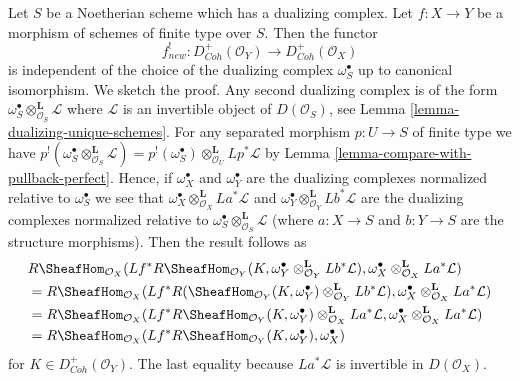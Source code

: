 \begin{remark}
\label{remark-independent-omega-S}
Let $S$ be a Noetherian scheme which has a dualizing complex.
Let $f : X \to Y$ be a morphism of schemes of finite type
over $S$. Then the functor
$$
f_{new}^! : D^+_{Coh}(\mathcal{O}_Y) \to D^+_{Coh}(\mathcal{O}_X)
$$
is independent of the choice of the dualizing complex $\omega_S^\bullet$
up to canonical isomorphism. We sketch the proof. Any second dualizing complex
is of the form $\omega_S^\bullet \otimes_{\mathcal{O}_S}^\mathbf{L} \mathcal{L}$
where $\mathcal{L}$ is an invertible object of $D(\mathcal{O}_S)$, see
Lemma \ref{lemma-dualizing-unique-schemes}.
For any separated morphism $p : U \to S$ of finite type we have
$p^!(\omega_S^\bullet \otimes^\mathbf{L}_{\mathcal{O}_S} \mathcal{L}) =
p^!(\omega_S^\bullet) \otimes^\mathbf{L}_{\mathcal{O}_U} Lp^*\mathcal{L}$
by Lemma \ref{lemma-compare-with-pullback-perfect}.
Hence, if $\omega_X^\bullet$ and $\omega_Y^\bullet$ are the
dualizing complexes normalized relative to $\omega_S^\bullet$ we see that
$\omega_X^\bullet \otimes_{\mathcal{O}_X}^\mathbf{L} La^*\mathcal{L}$ and
$\omega_Y^\bullet \otimes_{\mathcal{O}_Y}^\mathbf{L} Lb^*\mathcal{L}$
are the dualizing complexes normalized relative to
$\omega_S^\bullet \otimes_{\mathcal{O}_S}^\mathbf{L} \mathcal{L}$
(where $a : X \to S$ and $b : Y \to S$ are the structure morphisms).
Then the result follows as
\begin{align*}
& R\SheafHom_{\mathcal{O}_X}(Lf^*R\SheafHom_{\mathcal{O}_Y}(K,
\omega_Y^\bullet \otimes_{\mathcal{O}_Y}^\mathbf{L} Lb^*\mathcal{L}),
\omega_X^\bullet \otimes_{\mathcal{O}_X}^\mathbf{L} La^*\mathcal{L}) \\
& = R\SheafHom_{\mathcal{O}_X}(Lf^*R(\SheafHom_{\mathcal{O}_Y}(K,
\omega_Y^\bullet) \otimes_{\mathcal{O}_Y}^\mathbf{L} Lb^*\mathcal{L}),
\omega_X^\bullet \otimes_{\mathcal{O}_X}^\mathbf{L} La^*\mathcal{L}) \\
& = R\SheafHom_{\mathcal{O}_X}(Lf^*R\SheafHom_{\mathcal{O}_Y}(K,
\omega_Y^\bullet) \otimes_{\mathcal{O}_X}^\mathbf{L} La^*\mathcal{L},
\omega_X^\bullet \otimes_{\mathcal{O}_X}^\mathbf{L} La^*\mathcal{L}) \\
& = R\SheafHom_{\mathcal{O}_X}(Lf^*R\SheafHom_{\mathcal{O}_Y}(K,
\omega_Y^\bullet), \omega_X^\bullet)
\end{align*}
for $K \in D^+_{Coh}(\mathcal{O}_Y)$.
The last equality because $La^*\mathcal{L}$ is invertible in
$D(\mathcal{O}_X)$.
\end{remark}


